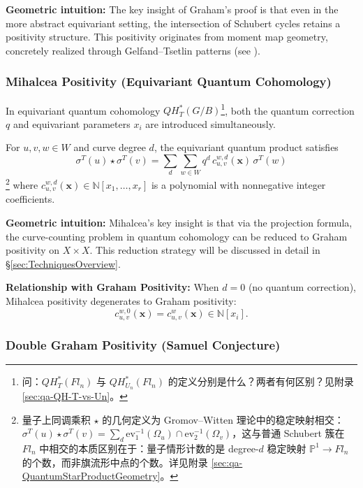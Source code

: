 \textbf{Geometric intuition:} The key insight of Graham's proof is that even in the more abstract equivariant setting, the intersection of Schubert cycles retains a positivity structure. This positivity originates from moment map geometry, concretely realized through Gelfand--Tsetlin patterns (see \cite[Section 3]{Gr}).

\subsubsection{Mihalcea Positivity (Equivariant Quantum Cohomology)}
\label{sec:MihalceaPositivityDetail}

In equivariant quantum cohomology $QH_T^*(G/B)$\footnote{问：$QH_T^*(Fl_n)$ 与 $QH_{U_n}^*(Fl_n)$ 的定义分别是什么？两者有何区别？见附录 \cref{sec:qa-QH-T-vs-Un}。}, both the quantum correction $q$ and equivariant parameters $x_i$ are introduced simultaneously.

\begin{Theorem}
\label{th:MihalceaPositivity}
For $u, v, w \in W$ and curve degree $d$, the equivariant quantum product satisfies
$$\sigma^T(u) \star \sigma^T(v) = \sum_{d} \sum_{w \in W} q^d \, c_{u,v}^{w,d}(\mathbf{x}) \, \sigma^T(w)$$\footnote{量子上同调乘积 $\star$ 的几何定义为 Gromov--Witten 理论中的稳定映射相交：$\sigma^T(u) \star \sigma^T(v) = \sum_d \mathrm{ev}_1^{-1}(\Omega_u) \cap \mathrm{ev}_2^{-1}(\Omega_v)$，这与普通 Schubert 簇在 $Fl_n$ 中相交的本质区别在于：量子情形计数的是 degree-$d$ 稳定映射 $\mathbb{P}^1 \to Fl_n$ 的个数，而非旗流形中点的个数。详见附录 \cref{sec:qa-QuantumStarProductGeometry}。}
where $c_{u,v}^{w,d}(\mathbf{x}) \in \mathbb{N}[x_1,\ldots,x_r]$ is a polynomial with nonnegative integer coefficients.
\end{Theorem}

\textbf{Geometric intuition:} Mihalcea's key insight is that via the projection formula, the curve-counting problem in quantum cohomology can be reduced to Graham positivity on $X \times X$. This reduction strategy will be discussed in detail in \S\ref{sec:TechniquesOverview}.

\textbf{Relationship with Graham Positivity:} When $d = 0$ (no quantum correction), Mihalcea positivity degenerates to Graham positivity:
$$c_{u,v}^{w,0}(\mathbf{x}) = c_{u,v}^w(\mathbf{x}) \in \mathbb{N}[x_i].$$

\subsubsection{Double Graham Positivity (Samuel Conjecture)}
\label{sec:DoubleGrahamPositivityDetail}

